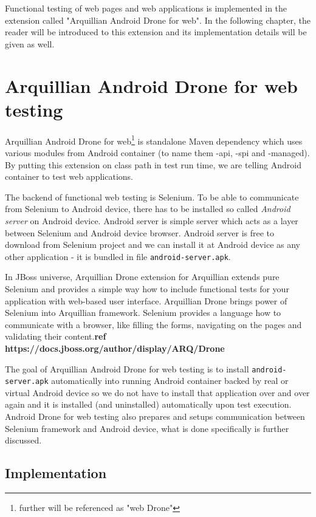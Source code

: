\documentclass[12pt,final,oneside]{fithesis}
\begin{document}
Functional testing of web pages and web applications is implemented in the extension called "Arquillian Android Drone for web". In the following chapter, the reader will be introduced to this extension and its implementation details will be given as well.

	\section{Arquillian Android Drone for web testing}

Arquillian Android Drone for web\footnote{further will be referenced as "web Drone"} is standalone Maven dependency which uses various modules from Android container (to name them -api, -spi and -managed). By putting this extension on class path in test run time, we are telling Android container to test web applications.

The backend of functional web testing is Selenium. To be able to communicate from Selenium to Android device, there has to be installed so called \textit{Android server} on Android device. Android server is simple server which acts as a layer between Selenium and Android device browser. Android server is free to download from Selenium project and we can install it at Android device as any other application - it is bundled in file \texttt{android-server.apk}.

In JBoss universe, Arquillian Drone extension for Arquillian extends pure Selenium and provides a simple way how to include functional tests for your application with web-based user interface. Arquillian Drone brings power of Selenium into Arquillian framework. Selenium provides a language how to communicate with a browser, like filling the forms, navigating on the pages and validating their content.\textbf{ref https://docs.jboss.org/author/display/ARQ/Drone}

The goal of Arquillian Android Drone for web testing is to install \texttt{android-server.apk} automatically into running Android container backed by real or virtual Android device so we do not have to install that application over and over again and it is installed (and uninstalled) automatically upon test execution. Android Drone for web testing also prepares and setups communication between Selenium framework and Android device, what is done specifically is further discussed.

	\subsection{Implementation}
\end{document}
